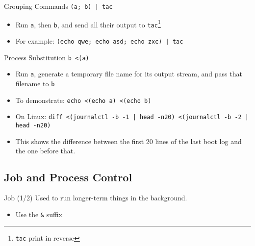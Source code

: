\documentclass[12pt]{beamer}
\begin{document}
\begin{frame}[fragile]{Grouping Commands}
  \texttt{(a; b) | tac}
  \begin{itemize}
    \item Run \texttt{a}, then \texttt{b}, and send all their output to \texttt{tac}\footnote{\texttt{tac} print in reverse}
    \item For example: \texttt{(echo qwe; echo asd; echo zxc) | tac}
  \end{itemize}
\end{frame}

\begin{frame}[fragile]{Process Substitution}
  \texttt{b <(a)}
  \begin{itemize}
    \item Run \texttt{a}, generate a temporary file name for its output stream, and pass that filename to \texttt{b}
    \item To demonstrate: \texttt{echo <(echo a) <(echo b)}
    \item On Linux: \texttt{diff <(journalctl -b -1 | head -n20) <(journalctl -b -2 | head -n20)}
    \item This shows the difference between the first 20 lines of the last boot log and the one before that.
  \end{itemize}
\end{frame}

\subsection{Job and Process Control}
\begin{frame}[fragile]{Job (1/2)}
  Used to run longer-term things in the background.
  \begin{itemize}
    \item Use the \texttt{&} suffix
  \end{itemize}
\end{frame}
\end{document}
